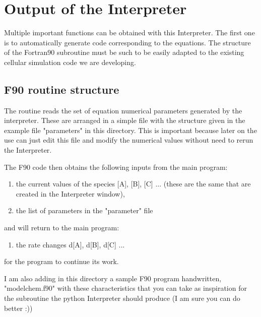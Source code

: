 \documentclass[11pt, oneside]{article}
\begin{document}
\section*{Output of the Interpreter}

Multiple important functions can be obtained with this Interpreter. The first one is to automatically generate code corresponding to the equations. The structure of the Fortran90 subroutine must be such to be easily adapted to the existing cellular simulation code we are developing. 

\subsection{F90 routine structure}

The routine reads the set of equation numerical parameters generated by the interpreter. These are arranged in a simple file with the structure given in the example file "parameters" in this directory. This is important because later on the use can just edit this file and modify the numerical values without need to rerun the Interpreter.

The F90 code then obtains the following inputs from the main program:
\begin{enumerate}
\item the current values of the species [A], [B], [C] ... (these are the same that are created in the Interpreter window),
\item the list of parameters in the "parameter" file
\end{enumerate}
and will return to the main program:
\begin{enumerate}\addtocounter{enumi}{2}
\item the rate changes d[A], d[B], d[C] ... 
\end{enumerate}
for the program to continue its work.

I am also adding in this directory a sample F90 program handwritten, "modelchem.f90" with these characteristics that you can take as inspiration for the subroutine the python Interpreter should produce (I am sure you can do better :))
\end{document}
